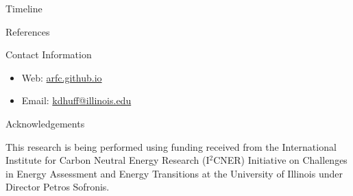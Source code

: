\documentclass[final]{beamer}
\newlength{\onecolwid}
\newlength{\threecolwid}
\begin{document}
\begin{frame}[t]
\begin{columns}[t,totalwidth=\threecolwid]
\begin{column}{\onecolwid}
\begin{block}{Timeline}
        
\end{block}





\begin{block}{References}
        {\small 
        }
\end{block}




\begin{alertblock}{Contact Information}
\begin{itemize}
	\item Web: \href{arfc.github.io}{arfc.github.io}
	\item Email: \href{mailto:kdhuff@illinois.edu}{kdhuff@illinois.edu}
\end{itemize}

\end{alertblock}



\begin{block}{Acknowledgements}

This research is being performed using funding received
from the International Institute for Carbon Neutral Energy Research (I$^2$CNER) 
Initiative on Challenges in Energy Assessment and Energy Transitions at  the  
University of Illinois under Director Petros Sofronis.


\end{block}
\end{column}
\end{columns}
\end{frame}
\end{document}
